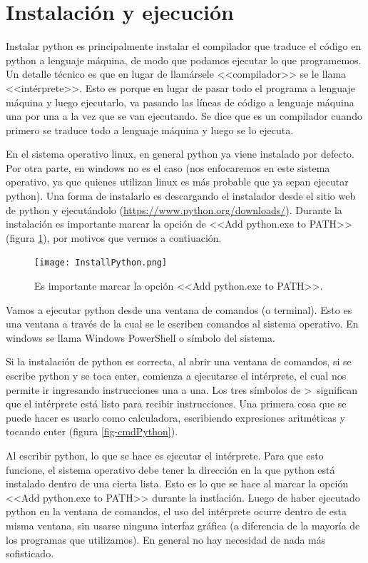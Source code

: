 \documentclass[a4paper, 12pt]{report}
\begin{document}
\section{Instalación y ejecución}\label{sec-instalyEjec}

Instalar python es principalmente instalar el compilador que traduce el código en python a lenguaje máquina, de modo que podamos ejecutar lo que programemos. Un detalle técnico es que en lugar de llamársele <<compilador>> se le llama <<intérprete>>. Esto es porque en lugar de pasar todo el programa a lenguaje máquina y luego ejecutarlo, va pasando las líneas de código a lenguaje máquina una por una a la vez que se van ejecutando. Se dice que es un compilador cuando primero se traduce todo a lenguaje máquina y luego se lo ejecuta.

En el sistema operativo linux, en general python ya viene instalado por defecto. Por otra parte, en windows no es el caso (nos enfocaremos en este sistema operativo, ya que quienes utilizan linux es más probable que ya sepan ejecutar python). Una forma de instalarlo es descargando el instalador desde el sitio web de python y ejecutándolo (\href{https://www.python.org/downloads/}{https://www.python.org/downloads/}). Durante la instalación es importante marcar la opción de <<Add python.exe to PATH>> (figura \ref{fig-InstallPython}), por motivos que vermos a contiuación.

\begin{figure}
	\centering
	\texttt{[image: InstallPython.png]}
	\caption{Es importante marcar la opción <<Add python.exe to PATH>>.}
	\label{fig-InstallPython}
\end{figure}

Vamos a ejecutar python desde una ventana de comandos (o terminal). Esto es una ventana a través de la cual se le escriben comandos al sistema operativo. En windows se llama Windows PowerShell o símbolo del sistema.

Si la instalación de python es correcta, al abrir una ventana de comandos, si se escribe python y se toca enter, comienza a ejecutarse el intérprete, el cual nos permite ir ingresando instrucciones una a una. Los tres símbolos de >~significan que el intérprete está listo para recibir instrucciones. Una primera cosa que se puede hacer es usarlo como calculadora, escribiendo expresiones aritméticas y tocando enter (figura \ref{fig-cmdPython}).

Al escribir python, lo que se hace es ejecutar el intérprete. Para que esto funcione, el sistema operativo debe tener la dirección en la que python está instalado dentro de una cierta lista. Esto es lo que se hace al marcar la opción <<Add python.exe to PATH>> durante la instlación. Luego de haber ejecutado python en la ventana de comandos, el uso del intérprete ocurre dentro de esta misma ventana, sin usarse ninguna interfaz gráfica (a diferencia de la mayoría de los programas que utilizamos). En general no hay necesidad de nada más sofisticado.
\end{document}
